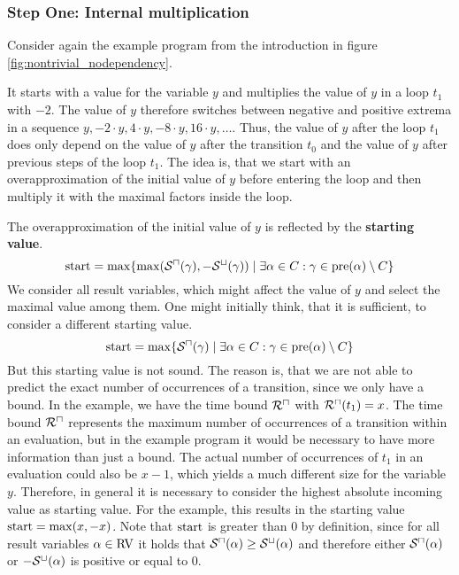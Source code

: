 \subsubsection{Step One: Internal multiplication}

Consider again the example program from the introduction in figure \ref{fig:nontrivial_nodependency}.



It starts with a value for the variable $y$ and multiplies the value of $y$ in a loop $t_1$ with $-2$.
The value of $y$ therefore switches between negative and positive extrema in a sequence $y, -2 \cdot y, 4 \cdot y, -8 \cdot y, 16 \cdot y, \dots$.
Thus, the value of $y$ after the loop $t_1$ does only depend on the value of $y$ after the transition $t_0$ and the value of $y$ after previous steps of the loop $t_1$.
The idea is, that we start with an overapproximation of the initial value of $y$ before entering the loop and then multiply it with the maximal factors inside the loop.

The overapproximation of the initial value of $y$ is reflected by the \textbf{starting value}.
\[ \text{start} = \max \lbrace \max({\mathcal{S}^\sqcap}(\gamma), -{\mathcal{S}^\sqcup}(\gamma)) \mid \exists \alpha \in C: \gamma \in \text{pre}(\alpha) \setminus C \rbrace \]
We consider all result variables, which might affect the value of $y$ and select the maximal value among them.
One might initially think, that it is sufficient, to consider a different starting value.
\[ \text{start} = \max \lbrace {\mathcal{S}^\sqcap}(\gamma) \mid \exists \alpha \in C: \gamma \in \text{pre}(\alpha) \setminus C \rbrace \]
But this starting value is not sound.
The reason is, that we are not able to predict the exact number of occurrences of a transition, since we only have a bound.
In the example, we have the time bound ${\mathcal{R}^\sqcap}$ with ${\mathcal{R}^\sqcap}(t_1) = x$.
The time bound ${\mathcal{R}^\sqcap}$ represents the maximum number of occurrences of a transition within an evaluation, but in the example program it would be necessary to have more information than just a bound.
The actual number of occurrences of $t_1$ in an evaluation could also be $x-1$, which yields a much different size for the variable $y$.
Therefore, in general it is necessary to consider the highest absolute incoming value as starting value.
For the example, this results in the starting value $\text{start} = \max(x, -x)$.
Note that $\text{start}$ is greater than $0$ by definition, since for all result variables $\alpha \in \text{RV}$ it holds that ${\mathcal{S}^\sqcap}(\alpha) \geq {\mathcal{S}^\sqcup}(\alpha)$ and therefore either ${\mathcal{S}^\sqcap}(\alpha)$ or $-{\mathcal{S}^\sqcup}(\alpha)$ is positive or equal to $0$.

